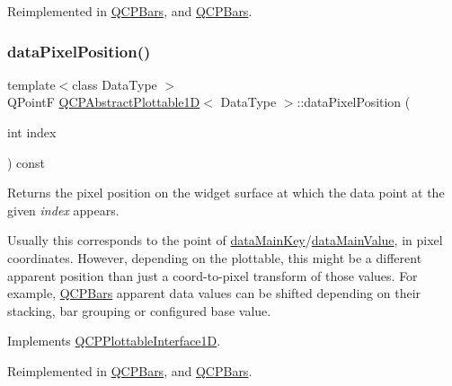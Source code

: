 Reimplemented in \hyperlink{class_q_c_p_bars_a55cdaf565cd3384158d1f7f89533bc2d}{Q\+C\+P\+Bars}, and \hyperlink{class_q_c_p_bars_a71faeb70a3834f1f391c1a7e11c9fce7}{Q\+C\+P\+Bars}.

\mbox{\label{class_q_c_p_abstract_plottable1_d_a14cf167457cda163575e6eec2a0b178d}} 
\subsubsection{\texorpdfstring{data\+Pixel\+Position()}{dataPixelPosition()}\hspace{0.1cm}{\footnotesize\ttfamily [2/2]}}
{\footnotesize\ttfamily template$<$class Data\+Type $>$ \\
Q\+PointF \hyperlink{class_q_c_p_abstract_plottable1_d}{Q\+C\+P\+Abstract\+Plottable1D}$<$ Data\+Type $>$\+::data\+Pixel\+Position (\begin{DoxyParamCaption}\item[{int}]{index }\end{DoxyParamCaption}) const\hspace{0.3cm}{\ttfamily [virtual]}}





Returns the pixel position on the widget surface at which the data point at the given {\itshape index} appears.

Usually this corresponds to the point of \hyperlink{class_q_c_p_abstract_plottable1_d_ab14ab428595856bf76e04499017fa8dc}{data\+Main\+Key}/\hyperlink{class_q_c_p_abstract_plottable1_d_a0f913bb0889ca7cb574657a078fc8cff}{data\+Main\+Value}, in pixel coordinates. However, depending on the plottable, this might be a different apparent position than just a coord-\/to-\/pixel transform of those values. For example, \hyperlink{class_q_c_p_bars}{Q\+C\+P\+Bars} apparent data values can be shifted depending on their stacking, bar grouping or configured base value. 

Implements \hyperlink{class_q_c_p_plottable_interface1_d_a78911838cfbcfd2d8df9ad2fdbfb8e93}{Q\+C\+P\+Plottable\+Interface1D}.



Reimplemented in \hyperlink{class_q_c_p_bars_a55cdaf565cd3384158d1f7f89533bc2d}{Q\+C\+P\+Bars}, and \hyperlink{class_q_c_p_bars_a71faeb70a3834f1f391c1a7e11c9fce7}{Q\+C\+P\+Bars}.

